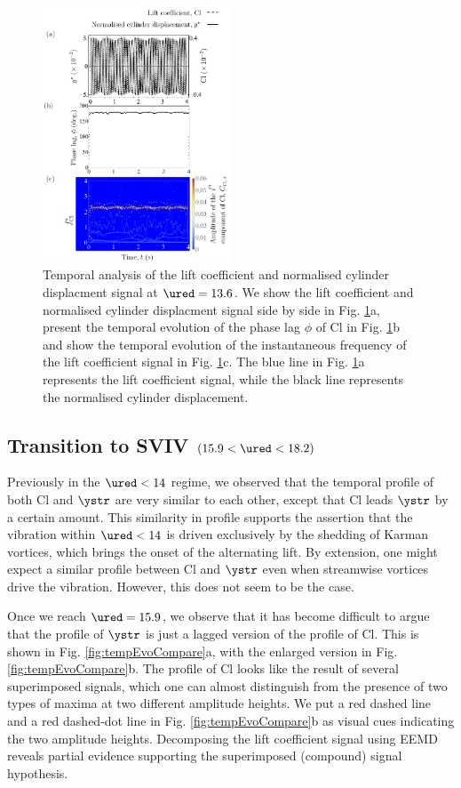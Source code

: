 \documentclass[a4paper,fleqn]{cas-sc}
\begin{document}
\begin{figure}
  \centering
  \includegraphics[width=0.5\textwidth]{figs/figure14}
  \caption{Temporal analysis of the lift coefficient and normalised cylinder displacment signal at $\ured = 13.6$. We show the lift coefficient and normalised cylinder displacment signal side by side in Fig. \ref{fig:tempAnalysisLower}a, present the temporal evolution of the phase lag $\phi$ of Cl in Fig. \ref{fig:tempAnalysisLower}b and show the temporal evolution of the instantaneous frequency of the lift coefficient signal in Fig. \ref{fig:tempAnalysisLower}c. The blue line in Fig. \ref{fig:tempAnalysisLower}a represents the lift coefficient signal, while the black line represents the normalised cylinder displacement.} \label{fig:tempAnalysisLower}
\end{figure}

\subsection{Transition to SVIV $\left (15.9 < \ured < 18.2 \right )$} \label{ssec:transSVIV}
Previously in the $\ured < 14$ regime, we observed that the temporal profile of both Cl and  $\ystr$ are very similar to each other, except that Cl leads $\ystr$ by a certain amount. This similarity in profile supports the assertion that the vibration within $\ured < 14$ is driven exclusively by the shedding of Karman vortices, which brings the onset of the alternating lift. By extension, one might expect a similar profile between Cl and $\ystr$ even when streamwise vortices drive the vibration. However, this does not seem to be the case.

Once we reach $\ured = 15.9$, we observe that it has become difficult to argue that the profile of $\ystr$ is just a lagged version of the profile of Cl. This is shown in Fig. \ref{fig:tempEvoCompare}a, with the enlarged version in Fig. \ref{fig:tempEvoCompare}b. The profile of Cl looks like the result of several superimposed signals, which one can almost distinguish from the presence of two types of maxima at two different amplitude heights. We put a red dashed line and a red dashed-dot line in Fig. \ref{fig:tempEvoCompare}b as visual cues indicating the two amplitude heights. Decomposing the lift coefficient signal using EEMD reveals partial evidence supporting the superimposed (compound) signal hypothesis.
\end{document}
